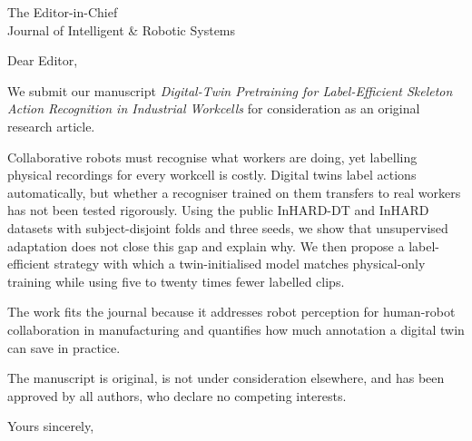 \documentclass[11pt]{letter}
\date{\today}
\begin{document}
\begin{letter}{The Editor-in-Chief\\Journal of Intelligent \& Robotic Systems}

\opening{Dear Editor,}

We submit our manuscript \emph{Digital-Twin Pretraining for Label-Efficient
Skeleton Action Recognition in Industrial Workcells} for consideration as an
original research article.

Collaborative robots must recognise what workers are doing, yet labelling
physical recordings for every workcell is costly. Digital twins label actions
automatically, but whether a recogniser trained on them transfers to real
workers has not been tested rigorously. Using the public InHARD-DT and InHARD
datasets with subject-disjoint folds and three seeds, we show that unsupervised
adaptation does not close this gap and explain why. We then propose a
label-efficient strategy with which a twin-initialised model matches
physical-only training while using five to twenty times fewer labelled clips.

The work fits the journal because it addresses robot perception for
human-robot collaboration in manufacturing and quantifies how much annotation
a digital twin can save in practice.

The manuscript is original, is not under consideration elsewhere, and has
been approved by all authors, who declare no competing interests.

\closing{Yours sincerely,}

\end{letter}
\end{document}
